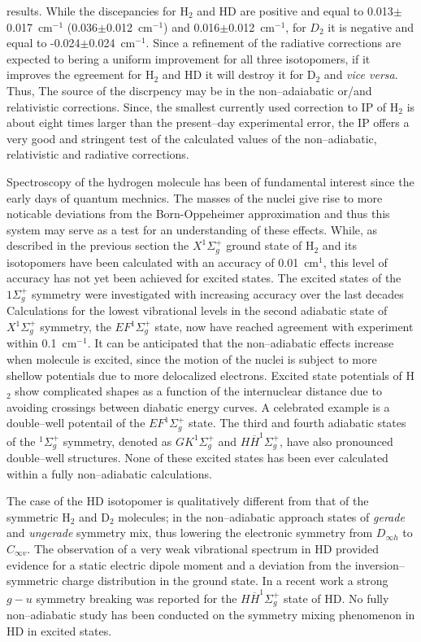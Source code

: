 {{results. While the discepancies for H$_2$ and HD are positive
and equal to 0.013$\pm$0.017~cm$^{-1}$ (0.036$\pm$0.012~cm$^{-1}$)
and 0.016$\pm$0.012~cm$^{-1}$, for $D_2$ it is negative
and equal to -0.024$\pm$0.024~cm$^{-1}$.
Since  a refinement of the radiative corrections are expected
to bering a uniform improvement for all three isotopomers, if
it improves the egreement for H$_2$ and HD it will destroy
it for D$_2$ and {\it vice versa}. Thus, The source of the discrpency
may be in the non--adaiabatic or/and relativistic corrections.
Since, the smallest currently used correction to IP of H$_2$
is about eight times larger than the present--day experimental error,
the IP offers a very good and stringent test of the
calculated values of the non--adiabatic, relativistic and
radiative corrections.

Spectroscopy of the hydrogen molecule has been of fundamental
interest since the early days of quantum mechnics.
The masses of the nuclei give rise to more noticable
deviations from the Born-Oppeheimer approximation
and thus this system  may serve as a test for an
understanding of these effects. While, as described in the
previous section the $X^1\Sigma_g^+$ ground state of H$_2$
and its isotopomers have been calculated with an accuracy
of 0.01~cm$^1$, this level of accuracy has not yet been
achieved for excited states. The excited states of the
$1\Sigma_g^+$ symmetry were investigated with increasing
accuracy over the last decades\cite{w1,w2}
Calculations for the lowest vibrational levels in the second adiabatic state
of $X^1\Sigma_g^+$ symmetry, the $EF^1\Sigma_g^+$ state,
now have reached agreement with experiment within 0.1~cm$^{-1}$.
It can be anticipated that the non--adiabatic
effects increase when molecule is excited, since
the motion of the nuclei is subject to more shellow
potentials due to more delocalized electrons.
Excited state potentials of H$_2$ show complicated
shapes as a function of the internuclear distance  due
to avoiding crossings between diabatic energy curves.
A celebrated example is a double--well potentail of the
$EF^1\Sigma_g^+$ state. The third and fourth adiabatic states of
the $^1\Sigma_g^+$ symmetry, denoted as $GK^1\Sigma_g^+$
and $H\overline{H}^1\Sigma_g^+$,
have also  pronounced double--well structures.
None of these excited states has been ever calculated
within a fully non--adiabatic calculations.


The case of the HD isotopomer is qualitatively different
from that of the symmetric H$_2$ and D$_2$ molecules;
in the non--adiabatic approach states of {\it gerade}
and {\it ungerade} symmetry mix, thus lowering the
electronic symmetry from $D_{\infty h}$ to $C_{\infty v}$.
The observation of a very weak vibrational spectrum in HD
provided evidence for a static electric dipole moment
and a deviation from the inversion--symmetric charge
distribution in the ground state.
In a recent work\cite{w28} a strong $g-u$
symmetry breaking was reported for the $H\overline{H}^1\Sigma_g^+$
state of HD. No fully non--adiabatic study has been
conducted on the symmetry mixing phenomenon in HD in
excited states.




}}
